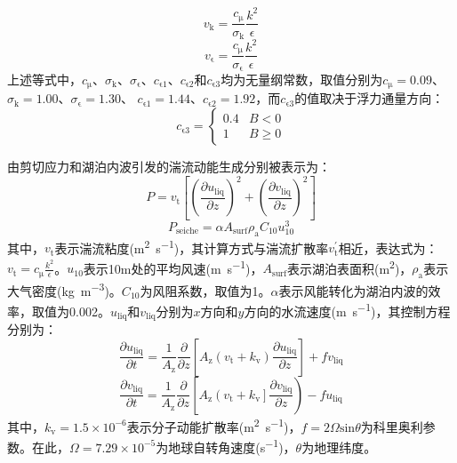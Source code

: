 \begin{equation}
    v_{\mathrm{k}} = \frac{c_{\mathrm{\mu}}}{\sigma_{\mathrm{k}}}\frac{k^2}{\epsilon}
\end{equation}
\begin{equation}
    v_{\mathrm{\epsilon}} = \frac{c_{\mathrm{\mu}}}{\sigma_{\mathrm{\epsilon}}}\frac{k^2}{\epsilon}
\end{equation}
上述等式中，$c_{\mathrm{\mu}}$、$\sigma_{\mathrm{k}}$、$\sigma_{\mathrm{\epsilon}}$、$c_{\mathrm{\epsilon 1}}$、$c_{\mathrm{\epsilon 2}}$和$c_{\mathrm{\epsilon 3}}$均为无量纲常数，取值分别为$c_{\mathrm{\mu}}=0.09$、$\sigma_{\mathrm{k}}=1.00$、$\sigma_{\mathrm{\epsilon}}=1.30$、 $c_{\mathrm{\epsilon 1}}=1.44$、$c_{\mathrm{\epsilon 2}}=1.92$，而$c_{\mathrm{\epsilon 3}}$的值取决于浮力通量方向：
\begin{equation}
  c_{\mathrm{\epsilon 3}}=\left\{\begin{array}{ll}0.4 & B<0  \\ 1 & B \geqslant 0 \end{array}\right.
\end{equation}

由剪切应力和湖泊内波引发的湍流动能生成分别被表示为：
\begin{equation}
    P = v_{\mathrm{t}} \left[\left(\frac{\partial u_{\mathrm{liq}}}{\partial z}\right)^2 + \left(\frac{\partial v_{\mathrm{liq}}}{\partial z}\right)^2 \right]
\end{equation}
\begin{equation}
    P_{\mathrm{seiche}} = \alpha A_{\mathrm{surf}} \rho_{\mathrm{a}} C_{\mathrm{10}} u^{\mathrm{3}}_{\mathrm{10}}
\end{equation}
其中，$v_{\mathrm{t}}$表示湍流粘度(\unit{m^2.s^{-1}})，其计算方式与湍流扩散率$v^{\mathrm{'}}_{\mathrm{t}}$相近，表达式为：$v_{\mathrm{t}}=c_{\mathrm{\mu}} \frac{k^2}{\epsilon}$。$u_{\mathrm{10}}$表示10\unit{m}处的平均风速(\unit{m.s^{-1}})，$A_{\mathrm{surf}}$表示湖泊表面积(\unit{m^2})，$\rho_{\mathrm{a}}$表示大气密度(\unit{kg.m^{-3}})。$C_{\mathrm{10}}$为风阻系数，取值为1。$\alpha$表示风能转化为湖泊内波的效率，取值为0.002。$u_{\mathrm{liq}}$和$v_{\mathrm{liq}}$分别为$x$方向和$y$方向的水流速度(\unit{m.s^{-1}})，其控制方程分别为：
\begin{equation}
    \frac{\partial u_{\mathrm{liq}}}{\partial t} = \frac{1}{A_{\mathrm{z}}} \frac{\partial}{\partial z} \left[A_{\mathrm{z}} \left(v_{\mathrm{t}} + k_{\mathrm{v}} \right) \frac{\partial u_{\mathrm{liq}}}{\partial z}\right] + f v_{\mathrm{liq}}
\end{equation}
\begin{equation}
    \frac{\partial v_{\mathrm{liq}}}{\partial t} = \frac{1}{A_{\mathrm{z}}} \frac{\partial}{\partial z} \left[A_{\mathrm{z}} \left(v_{\mathrm{t}} + k_{\mathrm{v}} \right] \frac{\partial v_{\mathrm{liq}}}{\partial z}\right) - f u_{\mathrm{liq}}
\end{equation}
其中，$k_{\mathrm{v}}=1.5×10^{-6}$表示分子动能扩散率(\unit{m^2.s^{-1}})，$f=2 \Omega \mathrm{sin}⁡\theta$为科里奥利参数。在此，$\Omega=7.29×10^{-5}$为地球自转角速度(\unit{s^{-1}})，$\theta$为地理纬度。


